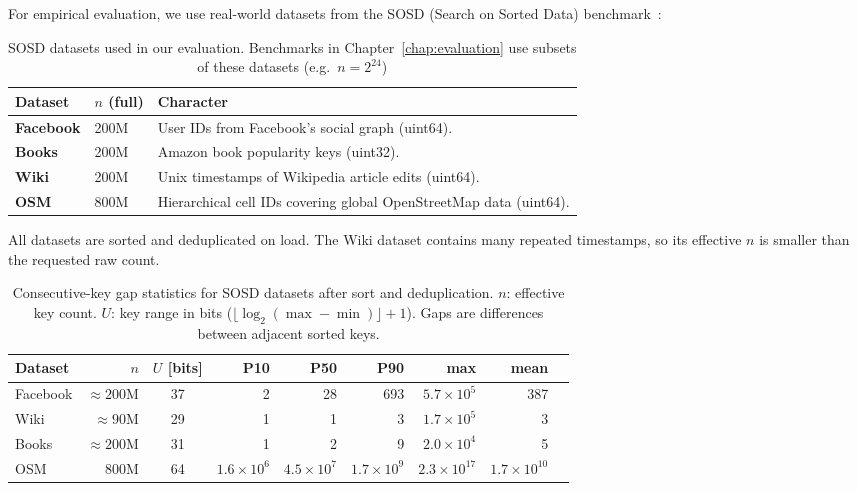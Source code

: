 For empirical evaluation, we use real-world datasets from the SOSD (Search on Sorted
Data) benchmark~\citep{kipf2019sosd}:

\begin{table}[H]
    \centering
    \begin{tabular}{@{}llp{}@{}}
        \toprule
        Dataset & $n$ (full) & Character \\
        \midrule
        \textbf{Facebook} & 200M &
        User IDs from Facebook's social graph (uint64). \\
        \textbf{Books} & 200M &
        Amazon book popularity keys (uint32). \\
        \textbf{Wiki} & 200M &
        Unix timestamps of Wikipedia article edits (uint64). \\
        \textbf{OSM} & 800M &
        Hierarchical cell IDs covering global OpenStreetMap data (uint64). \\
        \bottomrule
    \end{tabular}
    \caption{SOSD datasets used in our evaluation.
    Benchmarks in Chapter~\ref{chap:evaluation} use
    subsets of these datasets (e.g.\ $n = 2^{24}$)}
    \label{tab:sosd}
\end{table}

\begin{remark}
    All datasets are sorted and deduplicated on load.
    The Wiki dataset contains many repeated timestamps, so its effective $n$
    is smaller than the requested raw count.
\end{remark}

\begin{table}[H]
    \centering
    \begin{tabular*}{\textwidth}{@{\extracolsep{\fill}}lrcrrrrrr@{}}
        \toprule
        Dataset  & $n$                   & $U$ [bits]    & P10               & P50               & P90               & max               & mean \\
        \midrule
        Facebook & ${\approx}200\text{M}$ & 37           & 2                 & 28                & 693               & $5.7\times10^{5}$ & 387 \\
        Wiki     & ${\approx}90\text{M}$  & 29           & 1                 & 1                 & 3                 & $1.7\times10^{5}$ & 3 \\
        Books    & ${\approx}200\text{M}$ & 31           & 1                 & 2                 & 9                 & $2.0\times10^{4}$ & 5 \\
        OSM      & 800M                   & 64           & $1.6\times10^{6}$ & $4.5\times10^{7}$ & $1.7\times10^{9}$ & $2.3\times10^{17}$ & $1.7\times10^{10}$ \\
        \bottomrule
    \end{tabular*}
    \caption{Consecutive-key gap statistics for SOSD datasets after sort and deduplication.
        $n$: effective key count.
        $U$: key range in bits ($\lfloor\log_2(\max-\min)\rfloor + 1$).
        Gaps are differences between adjacent sorted keys.}
    \label{tab:sosd-gaps}
\end{table}

